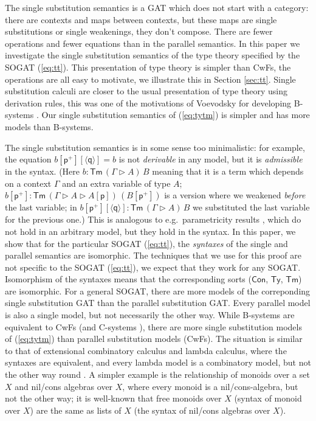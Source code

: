 \documentclass[sigplan,10pt,anonymous,review]{acmart}\settopmatter{printfolios=true,printccs=false,printacmref=false}
\newcommand{\Ty}{\mathsf{Ty}}
\newcommand{\Tm}{\mathsf{Tm}}
\newcommand{\Con}{\mathsf{Con}}
\newcommand{\p}{\mathsf{p}}
\newcommand{\q}{\mathsf{q}}
\newcommand{\ext}{\mathop{\triangleright}}
\begin{document}
The single substitution semantics is a GAT which does not start with a
category: there are contexts and maps between contexts, but these maps
are single substitutions or single weakenings, they don't
compose. There are fewer operations and fewer equations than in the
parallel semantics. In this paper we investigate the single
substitution semantics of the type theory specified by the SOGAT
(\ref{eq:tt}). This presentation of type theory is simpler than CwFs,
the operations are all easy to motivate, we illustrate this in Section
\ref{sec:tt}. Single substitution calculi are closer to the usual
presentation of type theory using derivation rules, this was one of
the motivations of Voevodsky for developing B-systems
\cite{AHRENS_EMMENEGGER_NORTH_RIJKE_2023}. Our single substitution
semantics of (\ref{eq:tytm}) is simpler and has more models than
B-systems.

The single substitution semantics is in some sense too minimalistic:
for example, the equation $b[\p^+][\langle\q\rangle] = b$ is not
\emph{derivable} in any model, but it is \emph{admissible} in the
syntax. (Here $b : \Tm\,(\Gamma\ext A)\,B$ meaning that it is a term
which depends on a context $\Gamma$ and an extra variable of type $A$;
$b[\p^+] : \Tm\,(\Gamma\ext A\ext A[\p])\,(B[\p^+])$ is a version
where we weakened \emph{before} the last variable; in
$b[\p^+][\langle\q\rangle] : \Tm\,(\Gamma\ext A)\,B$ we substituted
the last variable for the previous one.)  This is analogous to
e.g.\ parametricity results \cite{DBLP:journals/jfp/BernardyJP12},
which do not hold in an arbitrary model, but they hold in the
syntax. In this paper, we show that for the particular SOGAT
(\ref{eq:tt}), the \emph{syntaxes} of the single and parallel
semantics are isomorphic. The techniques that we use for this proof
are not specific to the SOGAT (\ref{eq:tt}), we expect
that they work for any SOGAT. Isomorphism of the syntaxes means that
the corresponding sorts ($\Con$, $\Ty$, $\Tm$) are isomorphic. For a
general SOGAT, there are more models of the correponding single
substitution GAT than the parallel substitution GAT. Every parallel
model is also a single model, but not necessarily the other way. While
B-systems are equivalent to CwFs (and C-systems
\cite{AHRENS_EMMENEGGER_NORTH_RIJKE_2023}), there are more single
substitution models of (\ref{eq:tytm}) than parallel substitution
models (CwFs). The situation is similar to that of extensional combinatory
calculus and lambda calculus, where the syntaxes are equivalent, and
every lambda model is a combinatory model, but not the other way round
\cite{DBLP:conf/fscd/AltenkirchKSV23}. A simpler example is the
relationship of monoids over a set $X$ and nil/cons algebras over $X$,
where every monoid is a nil/cons-algebra, but not the other way; it is
well-known that free monoids over $X$ (syntax of monoid over $X$) are
the same as lists of $X$ (the syntax of nil/cons algebras over $X$).
\end{document}
